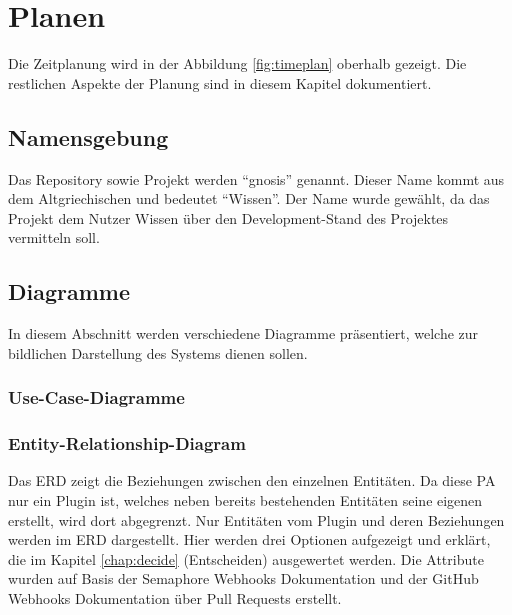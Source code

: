 \chapter{Planen}
\label{chap:plan}
Die Zeitplanung wird in der Abbildung \ref{fig:timeplan} oberhalb gezeigt. Die restlichen Aspekte der Planung sind in diesem Kapitel dokumentiert.

\section{Namensgebung}
Das Repository sowie Projekt werden \enquote{gnosis} genannt. Dieser Name kommt aus dem Altgriechischen und bedeutet
\enquote{Wissen}. Der Name wurde gewählt, da das Projekt dem Nutzer Wissen über den Development-Stand des Projektes
vermitteln soll. 

\section{Diagramme}
In diesem Abschnitt werden verschiedene Diagramme präsentiert, welche zur bildlichen Darstellung des Systems dienen sollen.
\subsection{Use-Case-Diagramme}
\subsection{Entity-Relationship-Diagram}
Das ERD zeigt die Beziehungen zwischen den einzelnen Entitäten. Da diese PA nur ein Plugin ist, welches neben
bereits bestehenden Entitäten seine eigenen erstellt, wird dort abgegrenzt. Nur Entitäten vom Plugin und
deren Beziehungen werden im ERD dargestellt. \newline
Hier werden drei Optionen aufgezeigt und erklärt, die im Kapitel \ref{chap:decide} (Entscheiden) ausgewertet werden. \newline
Die Attribute wurden auf Basis der Semaphore Webhooks Dokumentation \cite{semaphore_webhooks} und der GitHub Webhooks
Dokumentation über Pull Requests \cite{github_webhooks_pr} erstellt.

